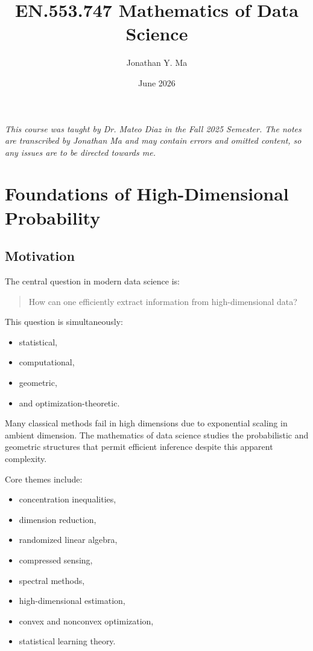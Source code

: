 \documentclass[12pt,oneside]{book}
\title{EN.553.747 Mathematics of Data Science}
\author{Jonathan Y. Ma}
\date{June 2026}
\numberwithin{equation}{section}
\theoremstyle{definition}
\theoremstyle{plain}
\theoremstyle{remark}
\begin{document}
\maketitle

\noindent \emph{This course was taught by Dr. Mateo Diaz in the Fall 2025 Semester. The notes are transcribed by Jonathan Ma and may contain errors and omitted content, so any issues are to be directed towards me.}

\tableofcontents

\chapter{Foundations of High-Dimensional Probability}

\section{Motivation}

The central question in modern data science is:

\begin{quote}
How can one efficiently extract information from high-dimensional data?
\end{quote}

This question is simultaneously:
\begin{itemize}
\item statistical,
\item computational,
\item geometric,
\item and optimization-theoretic.
\end{itemize}

Many classical methods fail in high dimensions due to exponential scaling in ambient dimension. The mathematics of data science studies the probabilistic and geometric structures that permit efficient inference despite this apparent complexity.

Core themes include:
\begin{itemize}
\item concentration inequalities,
\item dimension reduction,
\item randomized linear algebra,
\item compressed sensing,
\item spectral methods,
\item high-dimensional estimation,
\item convex and nonconvex optimization,
\item statistical learning theory.
\end{itemize}
\end{document}
